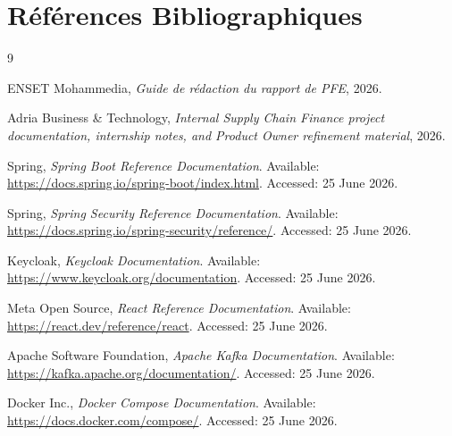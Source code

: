 \chapter*{R\'ef\'erences Bibliographiques}

\begin{thebibliography}{9}

ENSET Mohammedia, \textit{Guide de r\'edaction du rapport de PFE}, 2026.

Adria Business \& Technology, \textit{Internal Supply Chain Finance project documentation, internship notes, and Product Owner refinement material}, 2026.

Spring, \textit{Spring Boot Reference Documentation}. Available: \url{https://docs.spring.io/spring-boot/index.html}. Accessed: 25 June 2026.

Spring, \textit{Spring Security Reference Documentation}. Available: \url{https://docs.spring.io/spring-security/reference/}. Accessed: 25 June 2026.

Keycloak, \textit{Keycloak Documentation}. Available: \url{https://www.keycloak.org/documentation}. Accessed: 25 June 2026.

Meta Open Source, \textit{React Reference Documentation}. Available: \url{https://react.dev/reference/react}. Accessed: 25 June 2026.

Apache Software Foundation, \textit{Apache Kafka Documentation}. Available: \url{https://kafka.apache.org/documentation/}. Accessed: 25 June 2026.

Docker Inc., \textit{Docker Compose Documentation}. Available: \url{https://docs.docker.com/compose/}. Accessed: 25 June 2026.

\end{thebibliography}
